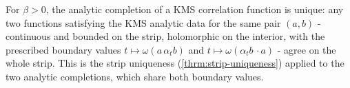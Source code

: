 \begin{theorem}
    \label{thrm:kms-correlation-unique}
    \leanok
    For $\beta > 0$, the analytic completion of a KMS correlation function is unique: any two functions satisfying the KMS analytic data for the same pair $(a, b)$ - continuous and bounded on the strip, holomorphic on the interior, with the prescribed boundary values $t \mapsto \omega(a\,\alpha_t b)$ and $t \mapsto \omega(\alpha_t b\,\cdot a)$ - agree on the whole strip. This is the strip uniqueness (\ref{thrm:strip-uniqueness}) applied to the two analytic completions, which share both boundary values.
\end{theorem}
